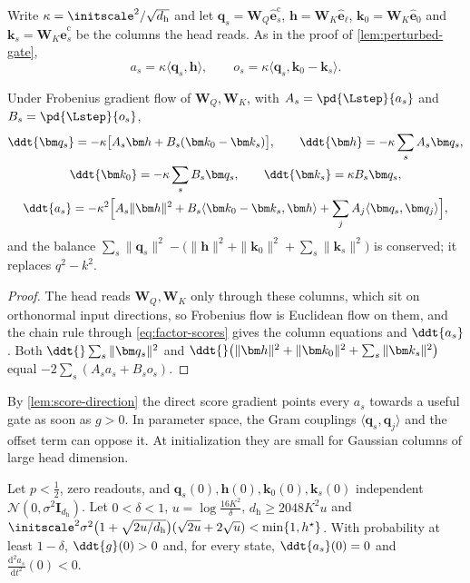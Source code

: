 Write $\kappa=\initscale^2/\sqrt{d_{\mathrm h}}$ and let $\bm q_s=\mathbf W_Q\hat{\bm e}^{\mathrm c}_s$, $\bm h=\mathbf W_K\hat{\bm e}_\ell$, $\bm k_0=\mathbf W_K\hat{\bm e}_0$ and
$\bm k_s=\mathbf W_K\hat{\bm e}^{\mathrm c}_s$ be the columns the head reads. As in the proof of \cref{lem:perturbed-gate},
\begin{equation}
 a_s=\kappa\langle\bm q_s,\bm h\rangle,\qquad o_s=\kappa\langle\bm q_s,\bm k_0-\bm k_s\rangle .
 \label{eq:factor-scores}
\end{equation}

\begin{lemma}
\label{lem:factor-flow}
Under Frobenius gradient flow of $\mathbf W_Q,\mathbf W_K$, with $A_s=\pd{\Lstep}{a_s}$ and $B_s=\pd{\Lstep}{o_s}$,
\begin{gather*}
 \ddt{\bm q_s}=-\kappa\bigl[A_s\bm h+B_s(\bm k_0-\bm k_s)\bigr],\qquad
 \ddt{\bm h}=-\kappa\sum_sA_s\bm q_s,\\
 \ddt{\bm k_0}=-\kappa\sum_sB_s\bm q_s,\qquad
 \ddt{\bm k_s}=\kappa B_s\bm q_s,\\
 \ddt{a_s}=-\kappa^2\Bigl[A_s\|\bm h\|^2+B_s\langle\bm k_0-\bm k_s,\bm h\rangle+\sum_jA_j\langle\bm q_s,\bm q_j\rangle\Bigr],
\end{gather*}
and the balance $\sum_s\|\bm q_s\|^2-\bigl(\|\bm h\|^2+\|\bm k_0\|^2+\sum_s\|\bm k_s\|^2\bigr)$ is conserved; it replaces $q^2-k^2$.
\end{lemma}

\begin{proof}
The head reads $\mathbf W_Q,\mathbf W_K$ only through these columns, which sit on orthonormal input directions, so Frobenius flow is Euclidean flow on
them, and the chain rule through \cref{eq:factor-scores} gives the column equations and $\ddt{a_s}$. Both
$\ddt{}\sum_s\|\bm q_s\|^2$ and $\ddt{}\bigl(\|\bm h\|^2+\|\bm k_0\|^2+\sum_s\|\bm k_s\|^2\bigr)$ equal $-2\sum_s(A_sa_s+B_so_s)$.
\end{proof}

By \cref{lem:score-direction} the direct score gradient points every $a_s$ towards a useful gate as soon as $g>0$. In parameter space,
the Gram couplings $\langle\bm q_s,\bm q_j\rangle$ and the offset term can oppose it. At initialization they are small for Gaussian columns
of large head dimension.

\begin{proposition}
\label{prop:gaussian-acceleration}
Let $p<\frac12$, zero readouts, and $\bm q_s(0),\bm h(0),\bm k_0(0),\bm k_s(0)$ independent $\mathcal N(0,\sigma^2\mathbf I_{d_{\mathrm h}})$. Let
$0<\delta<1$, $u=\log\frac{16K^2}\delta$, $d_{\mathrm h}\ge2048K^2u$ and
$\initscale^2\sigma^2\bigl(1+\sqrt{2u/d_{\mathrm h}}\bigr)(\sqrt{2u}+2\sqrt u)<\min\{1,h^\star\}$. With probability at least $1-\delta$,
$\ddt{g}(0)>0$ and, for every state, $\ddt{a_s}(0)=0$ and $\frac{\mathrm d^2a_s}{\mathrm dt^2}(0)<0$.
\end{proposition}

